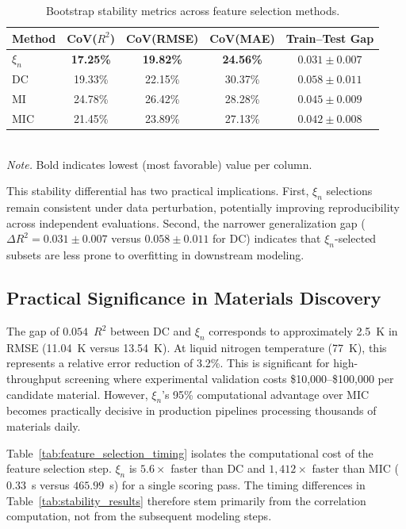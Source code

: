 \documentclass[twoside,11pt]{article}
\begin{document}
\begin{table}[t]
\centering
\caption{Bootstrap stability metrics across feature selection methods.}
\label{tab:bootstrap_cv}
\begin{tabular}{lcccc}
\toprule
Method & CoV($R^2$) & CoV(RMSE) & CoV(MAE) & Train--Test Gap \\
\midrule
$\xi_n$ & \textbf{17.25\%} & \textbf{19.82\%} & \textbf{24.56\%}
  & $\mathbf{0.031 \pm 0.007}$ \\
DC      & 19.33\% & 22.15\% & 30.37\% & $0.058 \pm 0.011$ \\
MI      & 24.78\% & 26.42\% & 28.28\% & $0.045 \pm 0.009$ \\
MIC     & 21.45\% & 23.89\% & 27.13\% & $0.042 \pm 0.008$ \\
\bottomrule
\end{tabular}
\smallskip\\
{\small\textit{Note.} Bold indicates lowest (most favorable) value per column.}
\end{table}

This stability differential has two practical implications. First, $\xi_n$
selections remain consistent under data perturbation, potentially improving
reproducibility across independent evaluations. Second, the narrower
generalization gap ($\Delta R^{2} = 0.031 \pm 0.007$ versus
$0.058 \pm 0.011$ for DC) indicates that $\xi_n$-selected subsets are less
prone to overfitting in downstream modeling.

\subsection{Practical Significance in Materials Discovery}
\label{sec:practical}
The gap of $0.054$~$R^2$ between DC and $\xi_n$ corresponds to approximately
2.5~K in RMSE (11.04~K versus 13.54~K). At liquid nitrogen temperature
(77~K), this represents a relative error reduction of 3.2\%. This is
significant for high-throughput screening where experimental validation costs
\$10,000--\$100,000 per candidate material. However, $\xi_n$'s 95\%
computational advantage over MIC becomes practically decisive in production
pipelines processing thousands of materials daily.

Table~\ref{tab:feature_selection_timing} isolates the computational cost of the
feature selection step. $\xi_n$ is $5.6\times$ faster than DC and
$1{,}412\times$ faster than MIC ($0.33$~s versus $465.99$~s) for a single
scoring pass. The timing differences in Table~\ref{tab:stability_results}
therefore stem primarily from the correlation computation, not from the
subsequent modeling steps.
\end{document}
